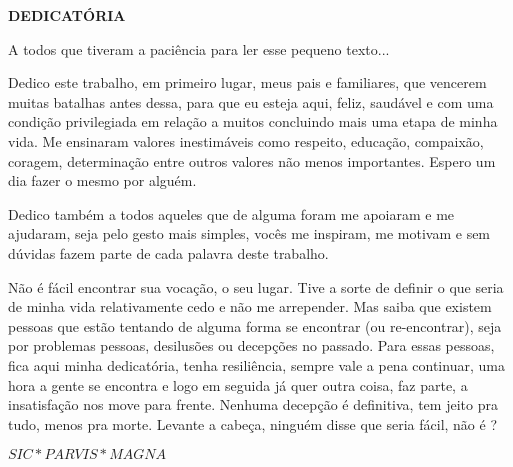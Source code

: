 \begin{center}
\textbf{DEDICATÓRIA}
\end{center}

$\!$\\


A todos que tiveram a paciência para ler esse pequeno texto...
\vspace{1cm}

Dedico este trabalho, em primeiro lugar, meus pais e familiares, que vencerem muitas batalhas antes dessa, para que eu esteja aqui, feliz, saudável e com uma condição privilegiada em relação a muitos concluindo mais uma etapa de minha vida. Me ensinaram valores inestimáveis como respeito, educação, compaixão, coragem, determinação entre outros valores não menos importantes. Espero um dia fazer o mesmo por alguém.

Dedico também a todos aqueles que de alguma foram me apoiaram e me ajudaram, seja pelo gesto mais simples, vocês me inspiram, me motivam e sem dúvidas fazem parte de cada palavra deste trabalho.


Não é fácil encontrar sua vocação, o seu lugar. Tive a sorte de definir o que seria de minha vida relativamente cedo e não me arrepender. Mas saiba que existem pessoas que estão tentando de alguma forma se encontrar (ou re-encontrar), seja por problemas pessoas, desilusões ou decepções no passado. Para essas pessoas, fica aqui minha dedicatória, tenha resiliência, sempre vale a pena continuar, uma hora a gente se encontra e logo em seguida já quer outra coisa, faz parte, a insatisfação nos move para frente. Nenhuma decepção é definitiva, tem jeito pra tudo, menos pra morte. Levante a cabeça, ninguém disse que seria fácil, não é ?

\vfill

$SIC * PARVIS * MAGNA$